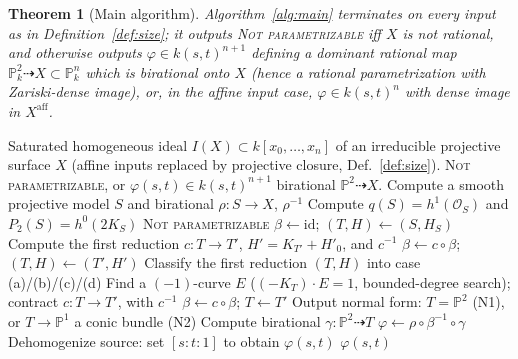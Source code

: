 \documentclass{amsart}
\theoremstyle{plain}
\newtheorem{theorem}{Theorem}
\theoremstyle{definition}
\newcommand{\PP}{\mathbb{P}}
\newcommand{\cO}{\mathcal{O}}
\begin{document}
\begin{theorem}[Main algorithm]\label{thm:main}
Algorithm~\ref{alg:main} terminates on every input as in
Definition~\ref{def:size}; it outputs \textsc{Not parametrizable} iff $X$ is not
rational, and otherwise outputs $\varphi\in k(s,t)^{n+1}$ defining a dominant
rational map $\PP^2_k\dashrightarrow X\subset\PP^n_k$ which is birational onto
$X$ (hence a rational parametrization with Zariski-dense image), or, in the
affine input case, $\varphi\in k(s,t)^{n}$ with dense image in
$X^{\mathrm{aff}}$.
\end{theorem}

\begin{algorithm}
\caption{Rational parametrization of a surface}\label{alg:main}
\begin{algorithmic}[1]
\Require Saturated homogeneous ideal $I(X)\subset k[x_0,\dots,x_n]$ of an
irreducible projective surface $X$ (affine inputs replaced by projective closure,
Def.~\ref{def:size}).
\Ensure \textsc{Not parametrizable}, or $\varphi(s,t)\in k(s,t)^{n+1}$ birational
$\PP^2\dashrightarrow X$.
\State Compute a smooth projective model $S$ and birational $\rho\colon S\to X$,
$\rho^{-1}$ 
\State Compute $q(S)=h^1(\cO_S)$ and $P_2(S)=h^0(2K_S)$ 
  \State \Return \textsc{Not parametrizable} 
\EndIf
\State $\beta\gets\mathrm{id}$; $(T,H)\gets(S,H_S)$ 
  \State Compute the first reduction $c\colon T\to T'$, $H'=K_{T'}+H'_0$, and $c^{-1}$
  \State $\beta\gets c\circ\beta$; $(T,H)\gets(T',H')$
\EndWhile
\State Classify the first reduction $(T,H)$ into case (a)/(b)/(c)/(d)
 
    \State Find a $(-1)$-curve $E$ ($(-K_T)\cdot E=1$, bounded-degree search);
    contract $c\colon T\to T'$, with $c^{-1}$
    \State $\beta\gets c\circ\beta$; $T\gets T'$
  \EndWhile
\EndIf
\State Output normal form: $T=\PP^2$ \textup{(N1)}, or $T\to\PP^1$ a conic bundle \textup{(N2)}
\State Compute birational $\gamma\colon\PP^2\dashrightarrow T$
\State $\varphi\gets\rho\circ\beta^{-1}\circ\gamma$ 
\State Dehomogenize source: set $[s:t:1]$ to obtain $\varphi(s,t)$
\State \Return $\varphi(s,t)$
\end{algorithmic}
\end{algorithm}
\end{document}
